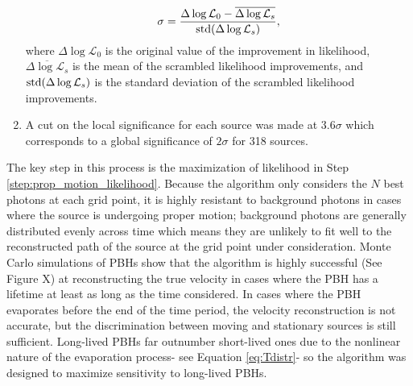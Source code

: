 \begin{enumerate}
\noindent
\begin{equation}
\sigma = \frac{\Delta \log \mathcal{L}_0 - \overline{\Delta \log \mathcal{L}_s}}{\textup{std}(\Delta \log \mathcal{L}_s)},
\end{equation}
where $\Delta \log \mathcal{L}_0$ is the original value of the improvement in likelihood, $\overline{\Delta \log \mathcal{L}_s}$ is the mean of the scrambled likelihood improvements, and $\textup{std}(\Delta \log \mathcal{L}_s)$ is the standard deviation of the scrambled likelihood improvements.
\item
A cut on the local significance for each source was made at $3.6 \sigma$ which corresponds to a global significance of $2 \sigma$ for 318 sources. 
\end{enumerate}

The key step in this process is the maximization of likelihood in Step \ref{step:prop_motion_likelihood}. 
Because the algorithm only considers the $N$ best photons at each grid point, it is highly resistant to background photons in cases where the source is undergoing proper motion; background photons are generally distributed evenly across time which means they are unlikely to fit well to the reconstructed path of the source at the grid point under consideration.
Monte Carlo simulations of PBHs show that the algorithm is highly successful (See Figure X) at reconstructing the true velocity in cases where the PBH has a lifetime at least as long as the time considered.
In cases where the PBH evaporates before the end of the time period, the velocity reconstruction is not accurate, but the discrimination between moving and stationary sources is still sufficient.
Long-lived PBHs far outnumber short-lived ones due to the nonlinear nature of the evaporation process- see Equation \ref{eq:Tdistr}- so the algorithm was designed to maximize sensitivity to long-lived PBHs.

